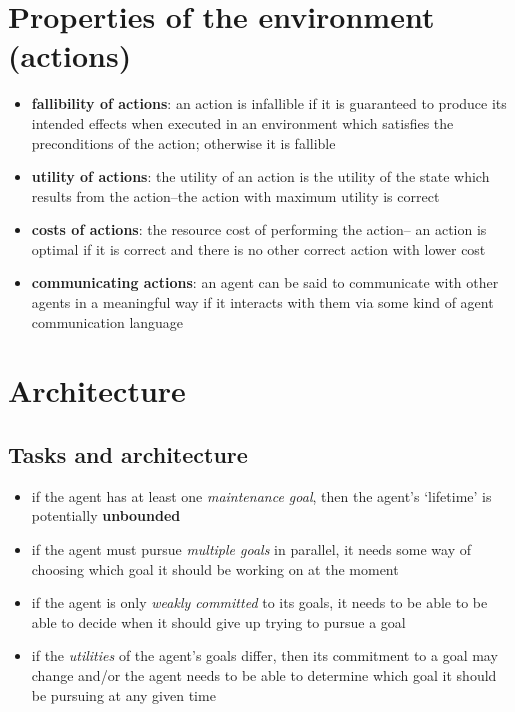 \documentclass{article}
\begin{document}
\section{Properties of the environment (actions)}

\begin{itemize}
  \item \textbf{fallibility of actions}: an action is infallible if it is guaranteed to produce its intended effects when executed in an environment which satisfies the preconditions of the action; otherwise it is fallible 
  \item \textbf{utility of actions}: the utility of an action is the utility of the state which results from the action–the action with maximum utility is correct 
  \item \textbf{costs of actions}: the resource cost of performing the action– an action is optimal if it is correct and there is no other correct action with lower cost 
  \item \textbf{communicating actions}: an agent can be said to communicate with other agents in a meaningful way if it interacts with them via some kind of agent communication language
\end{itemize}

\section{Architecture}

\subsection{Tasks and architecture}

\begin{itemize}
  \item if the agent has at least one \textit{maintenance goal}, then the agent’s ‘lifetime’ is potentially \textbf{unbounded} 
  \item if the agent must pursue \textit{multiple goals} in parallel, it needs some way of choosing which goal it should be working on at the moment 
  \item if the agent is only \textit{weakly committed} to its goals, it needs to be able to be able to decide when it should give up trying to pursue a goal 
  \item if the \textit{utilities} of the agent’s goals differ, then its commitment to a goal may change and/or the agent needs to be able to determine which goal it should be pursuing at any given time
\end{itemize}
\end{document}
